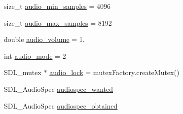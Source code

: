 \begin{DoxyCompactItemize}
\item 
size\-\_\-t \hyperlink{namespaceQuickCG_aff1dcb3d84732f1501f618bae7a211d3}{audio\-\_\-min\-\_\-samples} = 4096
\item 
size\-\_\-t \hyperlink{namespaceQuickCG_af934d17a78d6c65e321e148158f63421}{audio\-\_\-max\-\_\-samples} = 8192
\item 
double \hyperlink{namespaceQuickCG_ad6ea0eb1c2ae4140c72859770e194eba}{audio\-\_\-volume} = 1.
\item 
int \hyperlink{namespaceQuickCG_a26db757b0d9a686d14c1f271d91d4d34}{audio\-\_\-mode} = 2
\item 
S\-D\-L\-\_\-mutex $\ast$ \hyperlink{namespaceQuickCG_aebfd1d5f928c98978dd58d6a640356b3}{audio\-\_\-lock} = mutex\-Factory.\-create\-Mutex()
\item 
S\-D\-L\-\_\-\-Audio\-Spec \hyperlink{namespaceQuickCG_a65b3a8aa3b5ceec9c5bbcee730765075}{audiospec\-\_\-wanted}
\item 
S\-D\-L\-\_\-\-Audio\-Spec \hyperlink{namespaceQuickCG_ab1c0f30c0e3fc0863cfb58d665c4bdd4}{audiospec\-\_\-obtained}
\end{DoxyCompactItemize}


